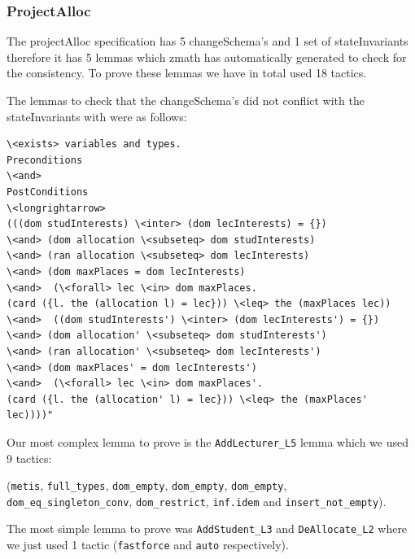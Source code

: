
\subsubsection{ProjectAlloc}

The projectAlloc specification \cite{mathlangexamples} has 5 changeSchema's and 1 set of stateInvariants
therefore it has 5 lemmas which \gls{zmath} has automatically generated to check
for the consistency. To prove these lemmas we have in total used 18 tactics.

The lemmas to check that the changeSchema's did not conflict with
the stateInvariants with were as follows:

\begin{verbatim}
\<exists> variables and types.
Preconditions
\<and>
PostConditions
\<longrightarrow>
(((dom studInterests) \<inter> (dom lecInterests) = {})
\<and> (dom allocation \<subseteq> dom studInterests)
\<and> (ran allocation \<subseteq> dom lecInterests)
\<and> (dom maxPlaces = dom lecInterests)
\<and>  (\<forall> lec \<in> dom maxPlaces.
(card ({l. the (allocation l) = lec})) \<leq> the (maxPlaces lec))
\<and>  ((dom studInterests') \<inter> (dom lecInterests') = {})
\<and> (dom allocation' \<subseteq> dom studInterests')
\<and> (ran allocation' \<subseteq> dom lecInterests')
\<and> (dom maxPlaces' = dom lecInterests')
\<and>  (\<forall> lec \<in> dom maxPlaces'.
(card ({l. the (allocation' l) = lec})) \<leq> the (maxPlaces' lec))))"
\end{verbatim}

Our most complex lemma to prove is the \verb|AddLecturer_L5| lemma which we used
9 tactics:

(\verb|metis|, \verb|full_types|, \verb|dom_empty|, \verb|dom_empty|,
\verb|dom_empty|, \\
 \verb|dom_eq_singleton_conv|, \verb|dom_restrict|,
\verb|inf.idem| and \verb|insert_not_empty|).

The most simple lemma to prove was \verb|AddStudent_L3| and \verb|DeAllocate_L2|
where we just used 1 tactic (\verb|fastforce| and \verb|auto| respectively).

